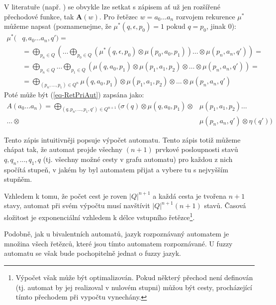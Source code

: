 \documentclass[a4paper,10pt]{article}
\begin{document}
\begin{note}
  V literatuře (např. \cite{SebJoh-InvFuzzAutInvFuzzLang} \cite{IgnCirBog-DetFuzAutMemValComResLat} \cite{Bel-DetFuzAut}) se obvykle lze setkat s  zápisem ať už jen rozšířené přechodové funkce, tak $\mathbf{A}(w)$. Pro řetězec $w = a_0 \dots a_n$ rozvojem rekurence $\mu^*$ můžeme napsat (poznamenejme, že $\mu^*(q, \epsilon, p_0) = 1$ pokud $q = p_0$, jinak $0$):
  \begin{align*}
   \mu^*(& q, a_0 \dots a_n, q') = \\
    &= \bigoplus_{p_n \in Q} \left( \dots \bigoplus_{p_0 \in Q} (\mu^*(q, \epsilon, p_0) \otimes \mu(p_0, a_0, p_1)) \dots \otimes \mu(p_n, a_n, q') \right) = \\
    &= \bigoplus_{p_n \in Q} \dots \bigoplus_{p_1 \in Q} \left( \mu(q, a_0, p_1) \otimes \mu(p_1, a_1, p_2) \otimes \dots \otimes \mu(p_n, a_n, q') \right) = \\
    &= \bigoplus_{(p_n,\dots, p_1) \in Q^n} \mu(q, a_0, p_1) \otimes \mu(p_1, a_1, p_2) \otimes \dots \otimes \mu(p_n, a_n, q')
  \end{align*}
  Poté může být (\ref{eq-RetPriAut}) zapsána jako:
  \begin{align*}
    A(a_0 \dots a_n) 
    = \bigoplus_{(q, p_n,\dots, p_1, q') \in Q^{n+1}} (\sigma(q) \otimes \mu(q, a_0, p_1) \otimes &\mu(p_1, a_1, p_2) \dots \\
     \dots \otimes &\mu(p_n, a_n, q') \otimes \eta(q'))
  \end{align*}

  Tento zápis intuitivněji popsuje výpočet automatu. Tento zápis totiž můžeme chápat tak, že automat projde všechny $(n+1)$ prvkové posloupnosti stavů $q, q_n, \dots, q_1, q$ (tj. všechny možné cesty v grafu automatu) pro každou z nich spočítá stupeň, v jakém by byl automatem přijat a vybere tu s nejvyšším stupňěm.
  
  Vzhledem k tomu, že počet cest je roven $|Q|^{n+1}$ a každá cesta je tvořena $n+1$ stavy, automat při svém výpočtu musí navštívit $|Q|^{n+1}(n+1)$ stavů. Časová složitost je exponenciální vzhledem k délce vstupního řetězce\footnote{Výpočet však může být optimalizován. Pokud některý přechod není definován (tj. automat by jej realizoval v nulovém stupni) můžou být cesty, procházející tímto přechodem při vypočtu vynechány.}.
\end{note}

Podobně, jak u bivalentních automatů, jazyk rozpoznávaný automatem je množina všech řetězců, které jsou tímto automatem rozpoznávané. U fuzzy automatu se však bude pochopitelně jednat o fuzzy jazyk.
\end{document}
